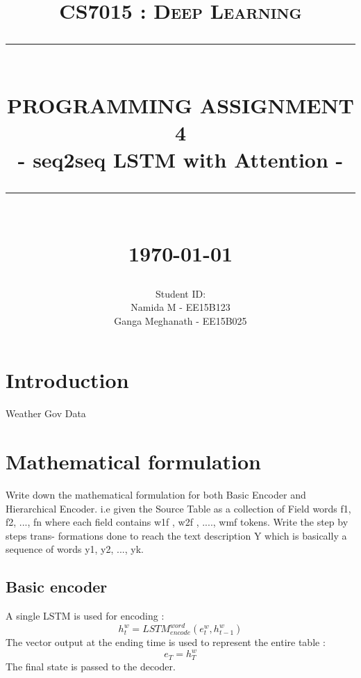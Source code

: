 \documentclass[12pt]{report}
\newcommand{\HRule}[1]{\rule{\linewidth}{#1}}
\begin{document}
\title{ \normalsize \textsc{CS7015 : Deep Learning}
		\\ [2.0cm]
		\HRule{0.5pt} \\
		\LARGE \textbf{\uppercase{Programming Assignment 4}}\\
        \large{- seq2seq LSTM with Attention -}
		\HRule{2pt} \\ [0.5cm]
		\normalsize \today \vspace*{5\baselineskip}}

\date{}

\author{
		Student ID:  \\ 
		Namida M - EE15B123 \\
		Ganga Meghanath - EE15B025
		}

\renewcommand\thesection{\arabic{section}}
\maketitle
\tableofcontents
\newpage

\sectionfont{\scshape}


\section{Introduction}
Weather Gov Data
\section{Mathematical formulation}
Write down the mathematical formulation for both Basic Encoder and Hierarchical Encoder. i.e given the Source Table as a collection of Field words {f1, f2, ..., fn} where each field contains {w1f , w2f , ...., wmf } tokens. Write the step by steps trans- formations done to reach the text description Y which is basically a sequence of words {y1, y2, ..., yk}.\\

\subsection{Basic encoder}
A single LSTM is used for encoding : 
\[
h^w_t = LSTM_{encode}^{word}(e^w_t, h^w_{t-1})
\]
The vector output at the ending time is used to represent the entire table : 
\[
e_T = h^w_{T}
\]
The final state is passed to the decoder.
\end{document}
